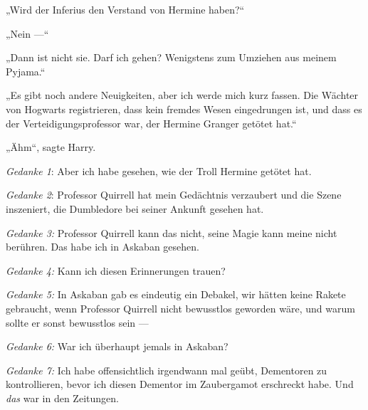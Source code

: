 „Wird der Inferius den Verstand von Hermine haben?“

„Nein —“

„Dann ist nicht sie. Darf ich gehen? Wenigstens zum Umziehen aus meinem Pyjama.“

„Es gibt noch andere Neuigkeiten, aber ich werde mich kurz fassen. Die Wächter von Hogwarts registrieren, dass kein fremdes Wesen eingedrungen ist, und dass es der Verteidigungsprofessor war, der Hermine Granger getötet hat.“

„Ähm“, sagte Harry.

\emph{Gedanke 1}: Aber ich habe gesehen, wie der Troll Hermine getötet hat.

\emph{Gedanke 2}: Professor Quirrell hat mein Gedächtnis verzaubert und die Szene inszeniert, die Dumbledore bei seiner Ankunft gesehen hat.

\emph{Gedanke 3:} Professor Quirrell kann das nicht, seine Magie kann meine nicht berühren. Das habe ich in Askaban gesehen.

\emph{Gedanke 4:} Kann ich diesen Erinnerungen trauen?

\emph{Gedanke 5:} In Askaban gab es eindeutig ein Debakel, wir hätten keine Rakete gebraucht, wenn Professor Quirrell nicht bewusstlos geworden wäre, und warum sollte er sonst bewusstlos sein —

\emph{Gedanke 6:} War ich überhaupt jemals in Askaban?

\emph{Gedanke 7:} Ich habe offensichtlich irgendwann mal geübt, Dementoren zu kontrollieren, bevor ich diesen Dementor im Zaubergamot erschreckt habe. Und \emph{das} war in den Zeitungen.

